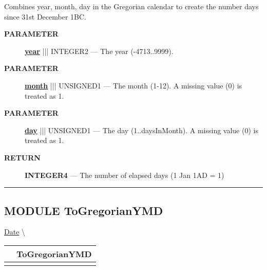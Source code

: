 \par





Combines year, month, day in the Gregorian calendar to create the number days since 31st December 1BC.






\par
\begin{description}
\item [\colorbox{tagtype}{\color{white} \textbf{\textsf{PARAMETER}}}] \textbf{\underline{year}} ||| INTEGER2 --- The year (-4713..9999).
\item [\colorbox{tagtype}{\color{white} \textbf{\textsf{PARAMETER}}}] \textbf{\underline{month}} ||| UNSIGNED1 --- The month (1-12). A missing value (0) is treated as 1.
\item [\colorbox{tagtype}{\color{white} \textbf{\textsf{PARAMETER}}}] \textbf{\underline{day}} ||| UNSIGNED1 --- The day (1..daysInMonth). A missing value (0) is treated as 1.
\end{description}







\par
\begin{description}
\item [\colorbox{tagtype}{\color{white} \textbf{\textsf{RETURN}}}] \textbf{INTEGER4} --- The number of elapsed days (1 Jan 1AD = 1)
\end{description}




\rule{\linewidth}{0.5pt}
\subsection*{\textsf{\colorbox{headtoc}{\color{white} MODULE}
ToGregorianYMD}}

\hypertarget{ecldoc:date.togregorianymd}{}
\hspace{0pt} \hyperlink{ecldoc:Date}{Date} \textbackslash 

{\renewcommand{\arraystretch}{1.5}
\begin{tabularx}{\textwidth}{|>{\raggedright\arraybackslash}l|X|}
\hline
\hspace{0pt}\mytexttt{\color{red} } & \textbf{ToGregorianYMD} \\
\hline
\multicolumn{2}{|>{\raggedright\arraybackslash}X|}{\hspace{0pt}\mytexttt{\color{param} (Days\_t days)}} \\
\hline
\end{tabularx}
}

